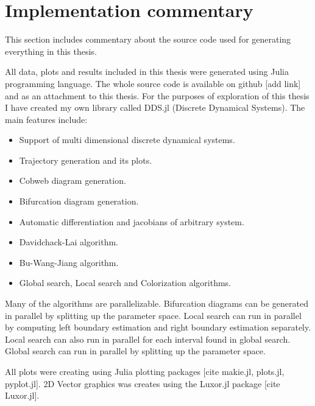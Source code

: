 \section{Implementation commentary}
This section includes commentary about the source code used for generating everything in this thesis.
\par
All data, plots and results included in this thesis were generated using Julia programming language.
The whole source code is available on github [add link] and as an attachment to this thesis.
For the purposes of exploration of this thesis I have created my own library called DDS.jl (Discrete Dynamical Systems).
The main features include:
\begin{itemize}
    \item Support of multi dimensional discrete dynamical systems.
    \item Trajectory generation and its plots.
    \item Cobweb diagram generation.
    \item Bifurcation diagram generation.
    \item Automatic differentiation and jacobians of arbitrary system.
    \item Davidchack-Lai algorithm.
    \item Bu-Wang-Jiang algorithm.
    \item Global search, Local search and Colorization algorithms.
\end{itemize}
Many of the algorithms are parallelizable.
Bifurcation diagrams can be generated in parallel by splitting up the parameter space.
Local search can run in parallel by computing left boundary estimation and right boundary estimation separately.
Local search can also run in parallel for each interval found in global search.
Global search can run in parallel by splitting up the parameter space.
\par
All plots were creating using Julia plotting packages [cite makie.jl, plots.jl, pyplot.jl].
2D Vector graphics was creates using the Luxor.jl package [cite Luxor.jl].

\endinput